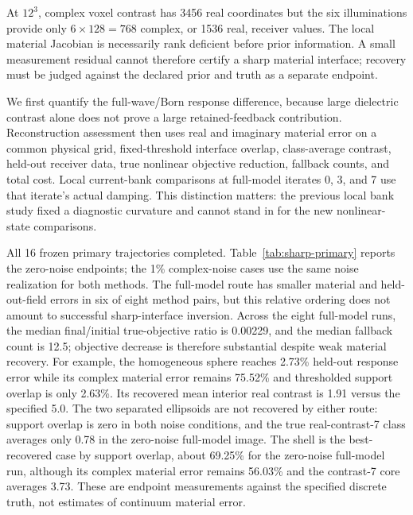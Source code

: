 At \(12^3\), complex voxel contrast has 3456 real coordinates but the six illuminations provide only \(6\times128=768\) complex, or 1536 real, receiver values. The local material Jacobian is necessarily rank deficient before prior information. A small measurement residual cannot therefore certify a sharp material interface; recovery must be judged against the declared prior and truth as a separate endpoint.

We first quantify the full-wave/Born response difference, because large dielectric contrast alone does not prove a large retained-feedback contribution. Reconstruction assessment then uses real and imaginary material error on a common physical grid, fixed-threshold interface overlap, class-average contrast, held-out receiver data, true nonlinear objective reduction, fallback counts, and total cost. Local current-bank comparisons at full-model iterates 0, 3, and 7 use that iterate's actual damping. This distinction matters: the previous local bank study fixed a diagnostic curvature and cannot stand in for the new nonlinear-state comparisons.

All 16 frozen primary trajectories completed. Table~\ref{tab:sharp-primary} reports the zero-noise endpoints; the 1\% complex-noise cases use the same noise realization for both methods. The full-model route has smaller material and held-out-field errors in six of eight method pairs, but this relative ordering does not amount to successful sharp-interface inversion. Across the eight full-model runs, the median final/initial true-objective ratio is 0.00229, and the median fallback count is 12.5; objective decrease is therefore substantial despite weak material recovery. For example, the homogeneous sphere reaches 2.73\% held-out response error while its complex material error remains 75.52\% and thresholded support overlap is only 2.63\%. Its recovered mean interior real contrast is 1.91 versus the specified 5.0. The two separated ellipsoids are not recovered by either route: support overlap is zero in both noise conditions, and the true real-contrast-7 class averages only 0.78 in the zero-noise full-model image. The shell is the best-recovered case by support overlap, about 69.25\% for the zero-noise full-model run, although its complex material error remains 56.03\% and the contrast-7 core averages 3.73. These are endpoint measurements against the specified discrete truth, not estimates of continuum material error.

